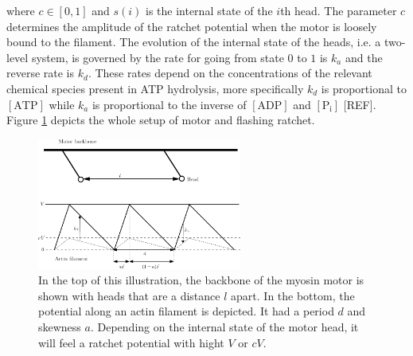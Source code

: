 \documentclass[aps,pre,onecolumn,showpacs,showkeys,a4paper]{revtex4}
\begin{document}
where $c\in\left[0,1\right]$ and $s(i)$ is the internal state of the $i$th head. The parameter $c$ determines the amplitude of the ratchet potential when the motor is loosely bound to the filament. The evolution of the internal state of the heads, i.e. a two-level system, is governed by the rate for going from state $0$ to $1$ is $k_{a}$ and the reverse rate is $k_{d}$.
These rates depend on the concentrations of the relevant chemical species present in ATP hydrolysis, more specifically $k_{d}$ is proportional to $[\text{ATP}]$ while $k_{a}$ is proportional to the inverse of $[\text{ADP}]$ and $[\text{P}_\text{i}]$ [REF]. Figure \ref{Fig: ratchet setup} depicts the whole setup of motor and flashing ratchet. 
\begin{figure}[h]
\centering
\includegraphics[width=0.6\textwidth,height=!]{ratchet_illustration}
\caption{In the top of this illustration, the backbone of the myosin motor is shown with heads that are a distance $l$ apart. In the bottom, the potential along an actin filament is depicted. It had a period $d$ and skewness $a$. Depending on the internal state of the motor head, it will feel a ratchet potential with hight $V$ or $cV$.} 
\label{Fig: ratchet setup}
\end{figure}
\end{document}
